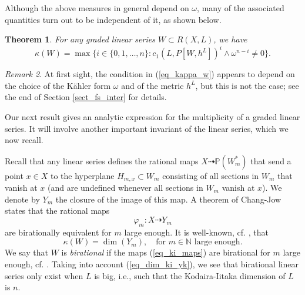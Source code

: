 \documentclass[12pt]{article}
\numberwithin{equation}{section}
\theoremstyle{theorem}
\newtheorem{thm}{Theorem}[section]
\theoremstyle{definition}
\theoremstyle{remark}
\newtheorem{rem}[thm]{Remark}
\newcommand{\nat}{\mathbb{N}}
\begin{document}
	Although the above measures in general depend on $\omega$, many of the associated quantities turn out to be independent of it, as shown below.
	\begin{thm}\label{thm_ki_form}
		For any graded linear series $W \subset R(X, L)$, we have
		\begin{equation}\label{eq_kappa_w}	
			\kappa(W) = \max\Big\{
				i \in \{ 0, 1, \ldots, n \} :  c_1(L, P[W, h^L])^{i} \wedge \omega^{n - i} \neq 0
			\Big\}.
		\end{equation}
	\end{thm}
	\begin{rem}
		At first sight, the condition in (\ref{eq_kappa_w}) appears to depend on the choice of the Kähler form $\omega$ and of the metric $h^L$, but this is not the case; see the end of Section \ref{sect_fs_inter} for details.
	\end{rem}
	\par 
	Our next result gives an analytic expression for the multiplicity of a graded linear series.
	It will involve another important invariant of the linear series, which we now recall.
	\par 
	Recall that any linear series defines the rational maps $X \dashrightarrow \mathbb{P}(W_m^*)$ that send a point $x \in X$ to the hyperplane $H_{m, x} \subset W_m$ consisting of all sections in $W_m$ that vanish at $x$ (and are undefined whenever all sections in $W_m$ vanish at $x$).
	We denote by $Y_m$ the closure of the image of this map.
	A theorem of Chang-Jow \cite[Theorem 1.1]{ChangJow} states that the rational maps 
	\begin{equation}\label{eq_ki_maps}
		\varphi_m : X \dashrightarrow Y_m
	\end{equation}
	are birationally equivalent for $m$ large enough.
	It is well-known, cf. \cite[Theorem 3.15]{BoucksomBourbaki}, that 
	\begin{equation}\label{eq_dim_ki_yk}
		\kappa(W) = \dim(Y_m), \quad \text{for } m \in \nat \text{ large enough}.
	\end{equation}
	We say that $W$ is \textit{birational} if the maps (\ref{eq_ki_maps}) are birational for $m$ large enough, cf. \cite[Definition 2.5]{LazMus}.
	Taking into account (\ref{eq_dim_ki_yk}), we see that birational linear series only exist when $L$ is big, i.e., such that the Kodaira-Iitaka dimension of $L$ is $n$.
	\par 
\end{document}
